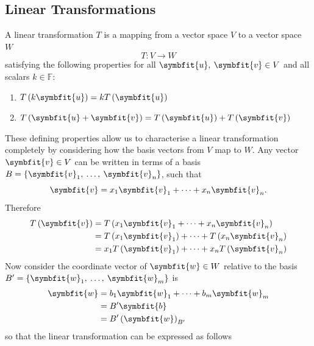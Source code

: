 \documentclass{article}
\begin{document}
\subsection{Linear Transformations}
A linear transformation \(T\) is a mapping from a vector space \(V\) to a vector space \(W\)
\begin{equation*}
    T:V \to W
\end{equation*}
satisfying the following properties for all \(\symbfit{u},\: \symbfit{v} \in V\) and all
scalars \(k \in \mathbb{F}\):
\begin{enumerate}
    \item \(T\left( k\symbfit{u} \right) = k T\left( \symbfit{u} \right)\)
    \item \(T\left( \symbfit{u} + \symbfit{v} \right) = T\left( \symbfit{u} \right) + T\left( \symbfit{v} \right)\)
\end{enumerate}
These defining properties allow us to characterise a linear transformation completely
by considering how the basis vectors from \(V\) map to \(W\). Any vector \(\symbfit{v} \in V\)
can be written in terms of a basis \(B = \left\{ \symbfit{v}_1,\: \dots,\: \symbfit{v}_n \right\}\), such that
\begin{equation*}
    \symbfit{v} = x_1 \symbfit{v}_1 + \cdots + x_n \symbfit{v}_n.
\end{equation*}
Therefore
\begin{align*}
    T\left( \symbfit{v} \right) & = T\left( x_1 \symbfit{v}_1 + \cdots + x_n \symbfit{v}_n \right)                 \\
                                & = T\left( x_1 \symbfit{v}_1 \right) + \cdots + T\left( x_n \symbfit{v}_n \right) \\
                                & = x_1 T\left( \symbfit{v}_1 \right) + \cdots + x_n T\left( \symbfit{v}_n \right)
\end{align*}
Now consider the coordinate vector of \(\symbfit{w} \in W\) relative to the basis \(B' = \left\{ \symbfit{w}_1,\: \dots,\: \symbfit{w}_m \right\}\) is
\begin{align*}
    \symbfit{w} & = b_1 \symbfit{w}_1 + \cdots + b_m \symbfit{w}_m \\
                & = B' \symbfit{b}                                 \\
                & = B' \left( \symbfit{w} \right)_{B'}
\end{align*}
so that the linear transformation can be expressed as follows
\end{document}
